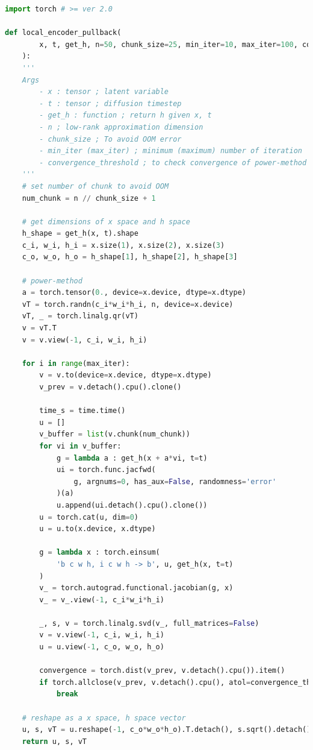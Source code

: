 \begin{lstlisting}[language=Python, caption=Python example, caption={\textbf{Jacobian subspace iteration}}, captionpos=b]
import torch # >= ver 2.0

def local_encoder_pullback(
        x, t, get_h, n=50, chunk_size=25, min_iter=10, max_iter=100, convergence_threshold=1e-4,
    ):
    '''
    Args
        - x : tensor ; latent variable
        - t : tensor ; diffusion timestep
        - get_h : function ; return h given x, t
        - n ; low-rank approximation dimension
        - chunk_size ; To avoid OOM error
        - min_iter (max_iter) ; minimum (maximum) number of iteration
        - convergence_threshold ; to check convergence of power-method
    '''
    # set number of chunk to avoid OOM
    num_chunk = n // chunk_size + 1

    # get dimensions of x space and h space
    h_shape = get_h(x, t).shape
    c_i, w_i, h_i = x.size(1), x.size(2), x.size(3)
    c_o, w_o, h_o = h_shape[1], h_shape[2], h_shape[3]

    # power-method
    a = torch.tensor(0., device=x.device, dtype=x.dtype)
    vT = torch.randn(c_i*w_i*h_i, n, device=x.device)
    vT, _ = torch.linalg.qr(vT)
    v = vT.T
    v = v.view(-1, c_i, w_i, h_i)

    for i in range(max_iter):
        v = v.to(device=x.device, dtype=x.dtype)
        v_prev = v.detach().cpu().clone()
        
        time_s = time.time()
        u = []
        v_buffer = list(v.chunk(num_chunk))
        for vi in v_buffer:
            g = lambda a : get_h(x + a*vi, t=t)
            ui = torch.func.jacfwd(
                g, argnums=0, has_aux=False, randomness='error'
            )(a)
            u.append(ui.detach().cpu().clone())
        u = torch.cat(u, dim=0)
        u = u.to(x.device, x.dtype)

        g = lambda x : torch.einsum(
            'b c w h, i c w h -> b', u, get_h(x, t=t)
        )
        v_ = torch.autograd.functional.jacobian(g, x)
        v_ = v_.view(-1, c_i*w_i*h_i)

        _, s, v = torch.linalg.svd(v_, full_matrices=False)
        v = v.view(-1, c_i, w_i, h_i)
        u = u.view(-1, c_o, w_o, h_o)
        
        convergence = torch.dist(v_prev, v.detach().cpu()).item()
        if torch.allclose(v_prev, v.detach().cpu(), atol=convergence_threshold) and (i > min_iter):
            break

    # reshape as a x space, h space vector
    u, s, vT = u.reshape(-1, c_o*w_o*h_o).T.detach(), s.sqrt().detach(), v.reshape(-1, c_i*w_i*h_i).detach()
    return u, s, vT
\end{lstlisting}

